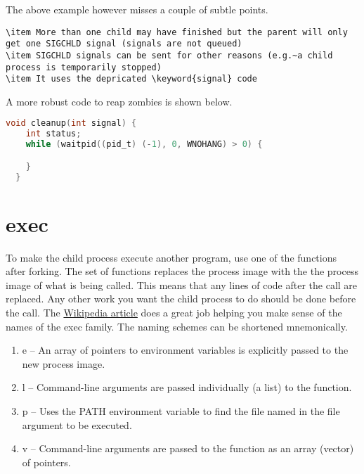 The above example however misses a couple of subtle points.
\begin{lstlisting}
\item More than one child may have finished but the parent will only get one SIGCHLD signal (signals are not queued)
\item SIGCHLD signals can be sent for other reasons (e.g.~a child process is temporarily stopped)
\item It uses the depricated \keyword{signal} code
\end{lstlisting}

A more robust code to reap zombies is shown below.

\begin{lstlisting}[language=C]
  void cleanup(int signal) {
    int status;
    while (waitpid((pid_t) (-1), 0, WNOHANG) > 0) {

    }
  }
\end{lstlisting}

\section{exec}

To make the child process execute another program, use one of the \href{http://man7.org/linux/man-pages/man3/exec.3.html}{} functions after forking.
The  set of functions replaces the process image with the the process image of what is being called.
This means that any lines of code after the  call are replaced.
Any other work you want the child process to do should be done before the  call.
The \href{https://en.wikipedia.org/wiki/Exec_(system_call)\#C_language_prototypes}{Wikipedia article} does a great job helping you make sense of the names of the exec family.
The naming schemes can be shortened mnemonically.

\begin{enumerate}
\item e -- An array of pointers to environment variables is explicitly passed to the new process image.
\item l -- Command-line arguments are passed individually (a list) to the function.
\item p -- Uses the PATH environment variable to find the file named in the file argument to be executed.
\item v -- Command-line arguments are passed to the function as an array (vector) of pointers.
\end{enumerate}

